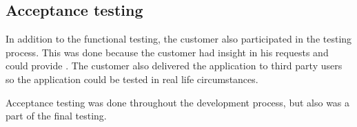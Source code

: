 \subsection{Acceptance testing}
In addition to the functional testing, the customer also participated in the testing process. This was done because the customer had insight in his requests and could provide . The customer also delivered the application to third party users so the application could be tested in real life circumstances.

Acceptance testing was done throughout the development process, but also was a part of the final testing.
